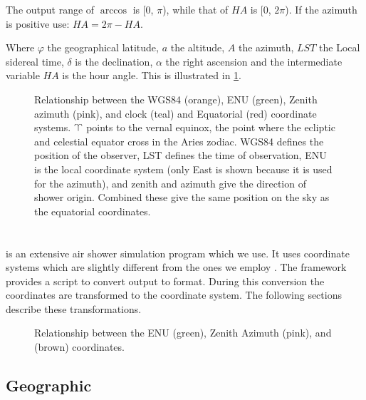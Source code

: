 The output range of $\arccos$ is [0, $\pi$), while that of $\mathit{HA}$ is
[0, $2\pi$). If the azimuth is positive use: $\mathit{HA} = 2 \pi -
\mathit{HA}$.

Where $\varphi$ the geographical latitude, $a$ the altitude, $A$ the
azimuth, $\mathit{LST}$ the Local sidereal time, $\delta$ is the
declination, $\alpha$ the right ascension and the intermediate variable
$\mathit{HA}$ is the hour angle. This is illustrated in
\cref{fig:wgs84_zenazi_lst_equatorial}.

\begin{figure}
    \centering
    
    \caption{Relationship between the WGS84 (orange), ENU (green),
             Zenith azimuth (pink), and clock (teal) and Equatorial
             (red) coordinate systems. $\vernal$ points to the vernal
             equinox, the point where the ecliptic and celestial equator
             cross in the Aries zodiac. WGS84 defines the position of
             the observer, LST defines the time of observation, ENU is
             the local coordinate system (only East is shown because it
             is used for the azimuth), and zenith and azimuth give the
             direction of shower origin. Combined these give the same
             position on the sky as the equatorial coordinates.}
    \label{fig:wgs84_zenazi_lst_equatorial}
\end{figure}


\section{\corsika}
\label{sec:corsika}

\corsika is an extensive air shower simulation program which we use. It
uses coordinate systems which are slightly different from the ones we
employ \cite{heck:2013aa}. The \sapphire framework provides a script to
convert \corsika output to \hdf format. During this conversion the
coordinates are transformed to the \hisparc coordinate system. The
following sections describe these transformations.

\begin{figure}
    \centering
    
    \caption{Relationship between the ENU (green), Zenith Azimuth (pink),
             and \corsika (brown) coordinates.}
    \label{fig:enu_zenazi_corsika}
\end{figure}


\subsection{Geographic}

